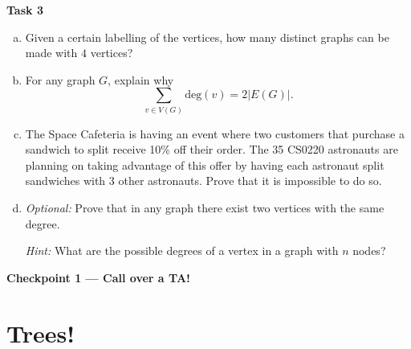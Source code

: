 \documentclass[12pt,letterpaper]{article}
\begin{document}
\newpage
\textbf{Task 3}
\begin{enumerate}[a.]
    \item Given a certain labelling of the vertices, how many distinct graphs can be made with $4$ vertices?
    
    \begin{mdframed} \vspace{2cm} \end{mdframed}
    
    \item For any graph $G$, explain why $$\sum_{v \in V(G)}\text{deg}(v) = 2|E(G)|.$$
    \begin{mdframed} \vspace{2cm} \end{mdframed}
    
    \item The Space Cafeteria is having an event where two customers that purchase a sandwich to split receive 10\% off their order. The 35 CS0220 astronauts are planning on taking advantage of this offer by having each astronaut split sandwiches with 3 other astronauts. Prove that it is impossible to do so.
    \begin{mdframed} \vspace{2cm} \end{mdframed}
    
    \item \textit{Optional:} Prove that in any graph there exist two vertices with the same degree.
    
    \textit{Hint:} What are the possible degrees of a vertex in a graph with $n$ nodes?
    \begin{mdframed} \vspace{2cm} \end{mdframed}
\end{enumerate}

\textbf{Checkpoint 1 — Call over a TA!}
\newpage

\section*{Trees!}
\end{document}
